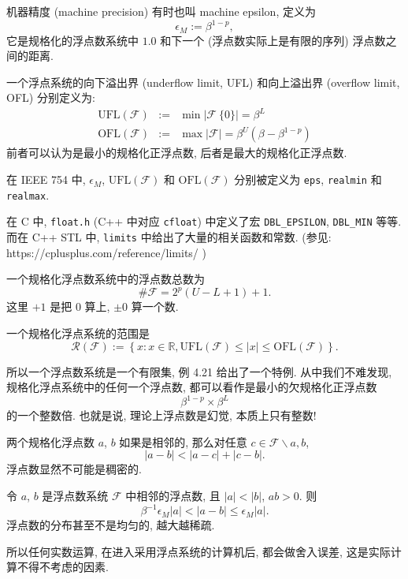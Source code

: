 \documentclass[a4paper]{ctexart}
\begin{document}
 机器精度 (machine precision) 有时也叫
machine epsilon, 定义为
$$
\epsilon_M := \beta^{1 - p},
$$
它是规格化的浮点数系统中 $1.0$ 和下一个 (浮点数实际上是有限的序列)
浮点数之间的距离.

 一个浮点系统的向下溢出界 (underflow limit, UFL)
和向上溢出界 (overflow limit, OFL) 分别定义为:
$$
\begin{array}{rcl}
  \mbox{UFL}(\mathscr{F}) &:=& \min \left|\mathscr{F} \ \{0\} \right|
  = \beta^{L} \\
  \mbox{OFL}(\mathscr{F}) &:=& \max \left|\mathscr{F} \right|
  = \beta^{U}\left(\beta - \beta^{1 - p}\right) 
\end{array}
$$
前者可以认为是最小的规格化正浮点数, 后者是最大的规格化正浮点数.  

 在 IEEE 754 中, $\epsilon_M$,
$\mbox{UFL}(\mathscr{F})$ 和 $\mbox{OFL}(\mathscr{F})$ 分别被定义为
\verb|eps|, \verb|realmin| 和 \verb|realmax|.

在 C 中, \verb|float.h| (C++ 中对应 \verb|cfloat|) 中定义了宏
\verb|DBL_EPSILON|, \verb|DBL_MIN| 等等. 而在 C++ STL 中,
\verb|limits| 中给出了大量的相关函数和常数.
(参见:\newline
https://cplusplus.com/reference/limits/
)

 一个规格化浮点数系统中的浮点数总数为
$$
\#\mathscr{F} = 2^p (U - L + 1) + 1.
$$
这里 $+1$ 是把 $0$ 算上, $\pm 0$ 算一个数.

 一个规格化浮点系统的范围是
$$
\mathscr{R}(\mathscr{F}) := \left\{x : x \in \mathbb{R},
\mbox{UFL}(\mathscr{F}) \leq |x| \leq \mbox{OFL}(\mathscr{F})\right\}.
$$

所以一个浮点数系统是一个有限集, 例 4.21 给出了一个特例. 从中我们不难发现,
规格化浮点系统中的任何一个浮点数, 都可以看作是最小的欠规格化正浮点数
$$
\beta^{1 - p} \times \beta^L
$$
的一个整数倍. 也就是说, 理论上浮点数是幻觉, 本质上只有整数!

 两个规格化浮点数 $a$, $b$ 如果是相邻的,
那么对任意 $c \in \mathscr{F} \backslash {a, b}$,
$$
|a - b| < |a - c| + |c - b|.
$$
浮点数显然不可能是稠密的.

 令 $a$, $b$ 是浮点数系统 $\mathscr{F}$
中相邻的浮点数, 且 $|a| < |b|$, $ab > 0$. 则
$$
\beta^{-1} \epsilon_M |a| < |a - b| \leq \epsilon_M |a|.
$$
浮点数的分布甚至不是均匀的, 越大越稀疏.

所以任何实数运算, 在进入采用浮点系统的计算机后, 都会做舍入误差,
这是实际计算不得不考虑的因素.
\end{document}
